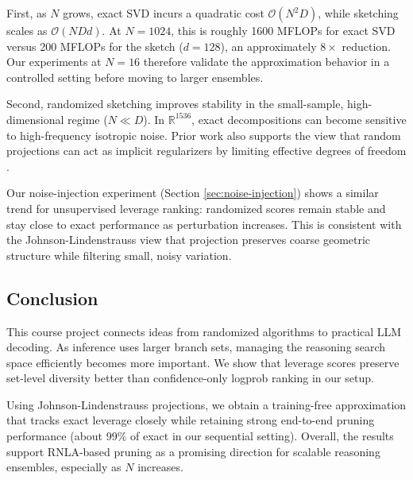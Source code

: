 \documentclass[11pt]{article}
\begin{document}
First, as $N$ grows, exact SVD incurs a quadratic cost $\mathcal{O}(N^2 D)$, while sketching scales as $\mathcal{O}(NDd)$. At $N=1024$, this is roughly 1600 MFLOPs for exact SVD versus 200 MFLOPs for the sketch ($d=128$), an approximately $8\times$ reduction. Our experiments at $N=16$ therefore validate the approximation behavior in a controlled setting before moving to larger ensembles.

Second, randomized sketching improves stability in the small-sample, high-dimensional regime ($N \ll D$). In $\mathbb{R}^{1536}$, exact decompositions can become sensitive to high-frequency isotropic noise. Prior work also supports the view that random projections can act as implicit regularizers by limiting effective degrees of freedom \cite{Durrant2013}.

Our noise-injection experiment (Section \ref{sec:noise-injection}) shows a similar trend for unsupervised leverage ranking: randomized scores remain stable and stay close to exact performance as perturbation increases. This is consistent with the Johnson-Lindenstrauss view that projection preserves coarse geometric structure while filtering small, noisy variation.

\subsection{Conclusion}
This course project connects ideas from randomized algorithms to practical LLM decoding. As inference uses larger branch sets, managing the reasoning search space efficiently becomes more important. We show that leverage scores preserve set-level diversity better than confidence-only logprob ranking in our setup.

Using Johnson-Lindenstrauss projections, we obtain a training-free approximation that tracks exact leverage closely while retaining strong end-to-end pruning performance (about 99\% of exact in our sequential setting). Overall, the results support RNLA-based pruning as a promising direction for scalable reasoning ensembles, especially as $N$ increases.



\end{document}
